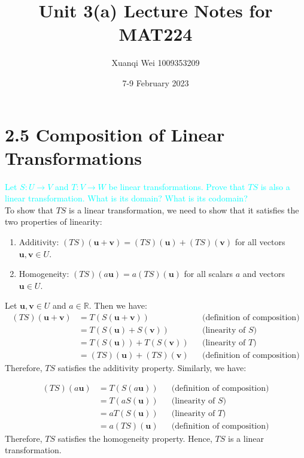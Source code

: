 \documentclass[fontsize=12pt]{scrartcl}
\title{Unit 3(a) Lecture Notes for MAT224}
\author{Xuanqi Wei 1009353209}
\date{7-9 February 2023}
\begin{document}
\maketitle

\newpage

\section{2.5 Composition of Linear Transformations}

\bigskip

\noindent
\textcolor{cyan}{Let $S:U \to V$ and $T: V \to W$ be linear transformations. Prove that $TS$ is also a linear transformation. What is its domain? What is its codomain?}\\

\noindent
To show that $TS$ is a linear transformation, we need to show that it satisfies the two properties of linearity:
\begin{enumerate}
	\item Additivity: $(TS)(\mathbf{u}+\mathbf{v}) = (TS)(\mathbf{u}) + (TS)(\mathbf{v})$ for all vectors $\mathbf{u}, \mathbf{v} \in U$.
	\item Homogeneity: $(TS)(a\mathbf{u}) = a(TS)(\mathbf{u})$ for all scalars $a$ and vectors $\mathbf{u} \in U$.
\end{enumerate}
\noindent
Let $\mathbf{u},\mathbf{v} \in U$ and $a \in \mathbb{R}$. Then we have:
\begin{align*}
(TS)(\mathbf{u}+\mathbf{v}) &= T(S(\mathbf{u}+\mathbf{v})) && \text{(definition of composition)}\\
&= T(S(\mathbf{u}) + S(\mathbf{v})) && \text{(linearity of }S\text{)}\\
&= T(S(\mathbf{u})) + T(S(\mathbf{v})) && \text{(linearity of }T\text{)}\\
&= (TS)(\mathbf{u}) + (TS)(\mathbf{v}) && \text{(definition of composition)}
\end{align*}
\noindent
Therefore, $TS$ satisfies the additivity property. Similarly, we have:

\begin{align*}
(TS)(a\mathbf{u}) &= T(S(a\mathbf{u})) && \text{(definition of composition)}\\
&= T(aS(\mathbf{u})) && \text{(linearity of }S\text{)}\\
&= aT(S(\mathbf{u})) && \text{(linearity of }T\text{)}\\
&= a(TS)(\mathbf{u}) && \text{(definition of composition)}
\end{align*}
\noindent
Therefore, $TS$ satisfies the homogeneity property. Hence, $TS$ is a linear transformation.
\end{document}

